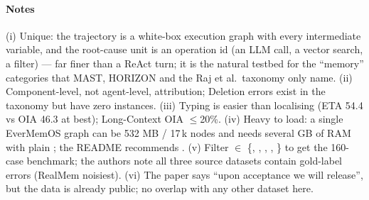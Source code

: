 \paragraph{Notes} (i) Unique: the trajectory is a white-box execution graph with every intermediate variable, and the root-cause unit is an operation id (an LLM call, a vector search, a filter) --- far finer than a ReAct turn; it is the natural testbed for the ``memory'' categories that MAST, HORIZON and the Raj et al.\ taxonomy only name. (ii) Component-level, not agent-level, attribution; Deletion errors exist in the taxonomy but have zero instances. (iii) Typing is easier than localising (ETA 54.4 vs OIA 46.3 at best); Long-Context OIA $\le$20\%. (iv) Heavy to load: a single EverMemOS graph can be 532 MB / 17\,k nodes and needs several GB of RAM with plain ; the README recommends . (v) Filter  $\in$ \{, , , , \} to get the 160-case benchmark; the authors note all three source datasets contain gold-label errors (RealMem noisiest). (vi) The paper says ``upon acceptance we will release'', but the data is already public; no overlap with any other dataset here.
